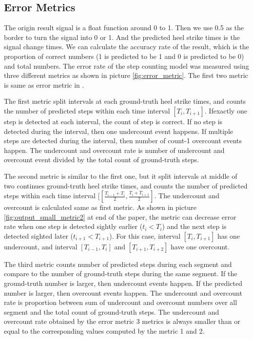 \documentclass[11pt]{article}
\begin{document}
{\subsection{Error Metrics}

The origin result signal is a float function around 0 to 1. Then we use 0.5 as the border to turn the signal into 0 or 1. And the predicted heel strike times is the signal change times. We can calculate the accuracy rate of the result, which is the proportion of correct numbers (1 is predicted to be 1 and 0 is predicted to be 0) and total numbers. The error rate of the step counting model was measured using three different metrics as shown in picture \ref{fig:error_metric}. The first two metric is same as error metric in \cite{flores2016weallwalk}.

The first metric split intervals at each ground-truth heel strike times, and counts the number of predicted steps within each time interval $[T_i, T_{i+1}]$.  Ifexactly one step is detected at each interval, the count of step is correct. If no step is detected during the interval, then one undercount event happens. If multiple steps are detected during the interval, then number of count-1 overcount events happen. The undercount and overcount rate is number of undercount and overcount event divided by the total count of ground-truth steps.

The second metric is similar to the first one,  but it  split intervals at middle of two continues ground-truth heel strike times, and counts the number of predicted steps within each time interval $[[\frac{T_{i-1}+T_i}{2}, \frac{T_i+T_{i+1}}{2}]$. The undercount and overcount is calculated same as first metric. As shown in picture \ref{fig:output_small_metric2} at end of the paper,  the metric can decrease error rate when one step is detected sightly earlier ($t_i<T_i$) and the next step is detected sighted later ($t_{i+1}<T_{i+1}$). For this case, interval $[T_i, T_{i+1}]$ has one undercount, and interval $[T_{i-1}, T_i]$ and $[T_{i+1}, T_{i+2}]$ have one overcount.

The third metric counts number of predicted steps during each segment and compare to the number of ground-truth steps during the same segment. If the ground-truth number is larger, then undercount events happen. If the predicted number is larger, then overcount events happen. The undercount and overcount rate is proportion between sum of undercount and overcount numbers over all segment and the total count of ground-truth steps. The undercount and overcount rate obtained by the error metric 3 metrics is always smaller than or equal to the corresponding values computed by the metric 1 and 2.

}
\end{document}
